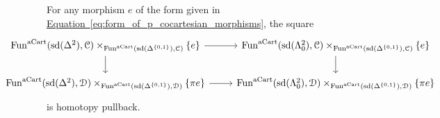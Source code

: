 \documentclass[main.tex]{subfiles}
\begin{document}
\begin{proposition}
  For any morphism $e$ of the form given in \hyperref[eq:form_of_p_cocartesian_morphisms]{Equation~\ref*{eq:form_of_p_cocartesian_morphisms}}, the square
  \begin{equation*}
    \noindent\makebox[\textwidth]{%
      \begin{tikzcd}[ampersand replacement=\&]
        \Fun^{\aCart}(\sd(\Delta^{2}), \category{C}) \times_{\Fun^{\aCart}(\sd(\Delta^{\{0, 1\}}), \category{C})} \{e\}
        \arrow[r]
        \arrow[d]
        \& \Fun^{\aCart}(\sd(\Lambda^{2}_{0}), \category{C}) \times_{\Fun^{\aCart}(\sd(\Delta^{\{0, 1\}}), \category{C})} \{e\}
        \arrow[d]
        \\
        \Fun^{\aCart}(\sd(\Delta^{2}), \category{D}) \times_{\Fun^{\aCart}(\sd(\Delta^{\{0, 1\}}), \category{D})} \{\pi e\}
        \arrow[r]
        \& \Fun^{\aCart}(\sd(\Lambda^{2}_{0}), \category{D}) \times_{\Fun^{\aCart}(\sd(\Delta^{\{0, 1\}}), \category{D})} \{\pi e\}
      \end{tikzcd}
    }
  \end{equation*}
  is homotopy pullback.
\end{proposition}
\end{document}
